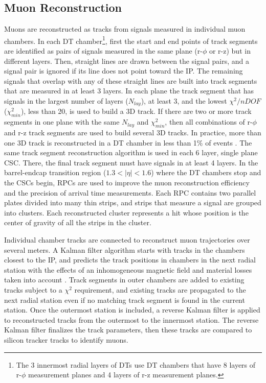 \subsection{Muon Reconstruction}
\label{sec:muReco}
Muons are reconstructed as tracks from signals measured in individual muon chambers.  In each DT chamber\footnote{The 3 innermost radial 
layers of DTs use DT chambers that have 8 layers of r-$\phi$ measurement planes and 4 layers of r-z measurement planes.}, first the start 
and end points of track segments are identified as pairs of signals measured in the same plane (r-$\phi$ or r-z) but in different layers.  
Then, straight lines are drawn between the signal pairs, and a signal pair is ignored if its line does not point toward the IP.  The 
remaining signals that overlap with any of these straight lines are built into track segments 
that are measured in at least 3 layers.  In each plane the track segment that has signals in the largest number of layers ($N_{lay}$), at 
least 3, and the lowest $\chi^{2}/nDOF$ ($\chi^{2}_{min}$), less than 20, is used to build a 3D track.  If there are two or more track 
segments in one plane with the same $N_{lay}$ and $\chi^{2}_{min}$, then all combinations of r-$\phi$ and r-z track segments are 
used to build several 3D tracks.  In practice, more than one 3D track is reconstructed in a DT chamber in less than 1\% of events 
\cite{cmsTdrPhysPerformance}.  The same 
track segment reconstruction algorithm is used in each 6 layer, single plane CSC.  There, the final track segment must have signals 
in at least 4 layers.  In the barrel-endcap transition region ($1.3 < |\eta| < 1.6$) where the DT chambers stop and the CSCs begin, RPCs 
are used to improve the muon reconstruction efficiency and the precision of arrival time measurements.  Each RPC contains two parallel 
plates divided into many thin strips, and strips that measure a signal are grouped into clusters.  Each reconstructed cluster represents 
a hit whose position is the center of gravity of all the strips in the cluster.

Individual chamber tracks are connected to reconstruct muon trajectories over several meters.  
A Kalman filter algorithm starts with tracks in the chambers closest to the IP, and predicts the track positions in chambers in the next 
radial station with the effects of an inhomogeneous magnetic field and material losses taken into account \cite{muonRecoFirstCollisions}.  
Track segments in outer chambers are added to existing tracks subject to a $\chi^{2}$ requirement, and existing tracks are propagated to 
the next radial station even if no matching track segment is found in the current station.  Once the outermost station is included, a 
reverse Kalman filter is applied to reconstructed tracks from the outermost to the innermost station.  The reverse Kalman filter finalizes 
the track parameters, then these tracks are compared to silicon tracker tracks to identify muons.

